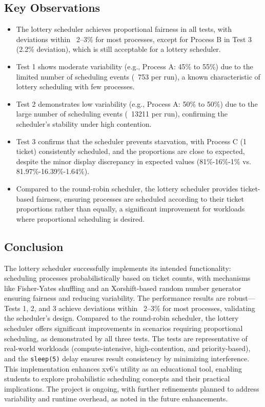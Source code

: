 \documentclass{article}
\begin{document}
\subsection{Key Observations}
\begin{itemize}
    \item The lottery scheduler achieves proportional fairness in all tests, with deviations within ~2–3\% for most processes, except for Process B in Test 3 (2.2\% deviation), which is still acceptable for a lottery scheduler.
    \item Test 1 shows moderate variability (e.g., Process A: 45\% to 55\%) due to the limited number of scheduling events (~753 per run), a known characteristic of lottery scheduling with few processes.
    \item Test 2 demonstrates low variability (e.g., Process A: 50\% to 50\%) due to the large number of scheduling events (~13211 per run), confirming the scheduler’s stability under high contention.
    \item Test 3 confirms that the scheduler prevents starvation, with Process C (1 ticket) consistently scheduled, and the proportions are close to expected, despite the minor display discrepancy in expected values (81\%-16\%-1\% vs. 81.97\%-16.39\%-1.64\%).
    \item Compared to the round-robin scheduler, the lottery scheduler provides ticket-based fairness, ensuring processes are scheduled according to their ticket proportions rather than equally, a significant improvement for workloads where proportional scheduling is desired.
\end{itemize}

\subsection{Conclusion}
The lottery scheduler successfully implements its intended functionality: scheduling processes probabilistically based on ticket counts, with mechanisms like Fisher-Yates shuffling and an Xorshift-based random number generator ensuring fairness and reducing variability. The performance results are robust—Tests 1, 2, and 3 achieve deviations within ~2–3\% for most processes, validating the scheduler’s design. Compared to the round-robin scheduler, the lottery scheduler offers significant improvements in scenarios requiring proportional scheduling, as demonstrated by all three tests. The tests are representative of real-world workloads (compute-intensive, high-contention, and priority-based), and the \texttt{sleep(5)} delay ensures result consistency by minimizing interference. This implementation enhances xv6’s utility as an educational tool, enabling students to explore probabilistic scheduling concepts and their practical implications. The project is ongoing, with further refinements planned to address variability and runtime overhead, as noted in the future enhancements.
\end{document}
